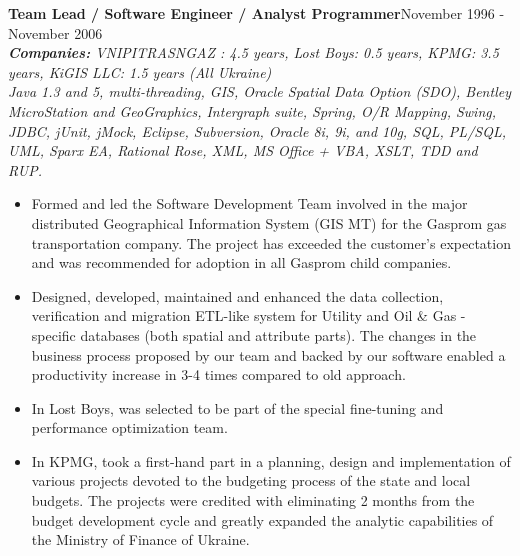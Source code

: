 \documentclass{res}
\newcommand{\aggjobdes}[4]{\needspace{3\baselineskip} %
{\noindent \bf #1\hspace{2ex}}{\hfill #2}\\
{{\noindent \small \textit{ \textbf{ Companies:} {\hfill #3}}}}\\{{\it \small #4.}}}
\begin{document}
\begin{resume}
\aggjobdes {Team Lead / Software Engineer / Analyst Programmer}{November 1996 - November 2006}
{VNIPITRASNGAZ : 4.5 years, Lost Boys: 0.5 years, KPMG: 3.5 years, KiGIS LLC: 1.5 years (All Ukraine)}
{Java 1.3 and 5, multi-threading, GIS, Oracle Spatial Data Option (SDO), Bentley MicroStation and GeoGraphics, Intergraph suite, Spring, O/R Mapping, Swing, JDBC, jUnit, jMock, Eclipse, Subversion, Oracle 8i, 9i, and 10g, SQL, PL/SQL, UML, Sparx EA, Rational Rose, XML, MS Office + VBA, XSLT, TDD and RUP}
\begin{itemize} %
 \item Formed and led the Software Development Team involved in the major distributed Geographical Information System (GIS MT) for the Gasprom gas transportation company. The project has exceeded the customer’s expectation and was recommended for adoption in all Gasprom child companies.
   \item Designed, developed, maintained and enhanced the data collection, verification and migration ETL-like system for Utility and Oil \& Gas - specific databases (both spatial and attribute parts). The changes in the business process proposed by our team and backed by our software enabled a productivity increase in 3-4 times compared to old approach.
 \item In Lost Boys, was selected to be part of the special fine-tuning and performance optimization team.
 \item In KPMG, took a first-hand part in a planning, design and implementation of various projects devoted to the budgeting process of the state and local budgets.  The projects were credited with eliminating 2 months from the budget development cycle and greatly expanded the analytic capabilities of the Ministry of Finance of Ukraine.
\end{itemize}


\end{resume}
\end{document}
